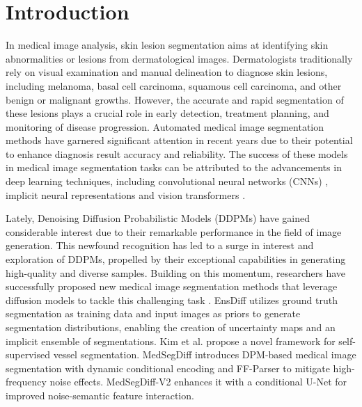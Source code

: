\documentclass[runningheads]{llncs}
\begin{document}
\section{Introduction}


In medical image analysis, skin lesion segmentation aims at identifying skin abnormalities or lesions from dermatological images. Dermatologists traditionally rely on visual examination and manual delineation to diagnose skin lesions, including melanoma, basal cell carcinoma, squamous cell carcinoma, and other benign or malignant growths. However, the accurate and rapid segmentation of these lesions plays a crucial role in early detection, treatment planning, and monitoring of disease progression. Automated medical image segmentation methods have garnered significant attention in recent years due to their potential to enhance diagnosis result accuracy and reliability. The success of these models in medical image segmentation tasks can be attributed to the advancements in deep learning techniques, including convolutional neural networks (CNNs) \cite{azad2022medical,ronneberger2015u,isensee2021nnu}, implicit neural representations \cite{molaei2023implicit} and vision transformers \cite{wang2021boundary,azad2023advances}.

Lately, Denoising Diffusion Probabilistic Models (DDPMs) \cite{ho2020denoising} have gained considerable interest due to their remarkable performance in the field of image generation. This newfound recognition has led to a surge in interest and exploration of DDPMs, propelled by their exceptional capabilities in generating high-quality and diverse samples. Building on this momentum, researchers have successfully proposed new medical image segmentation methods that leverage diffusion models to tackle this challenging task \cite{kazerouni2023diffusion}. EnsDiff \cite{wolleb2022diffusion} utilizes ground truth segmentation as training data and input images as priors to generate segmentation distributions, enabling the creation of uncertainty maps and an implicit ensemble of segmentations. Kim et al. \cite{kim2023diffusion} propose a novel framework for self-supervised vessel segmentation. MedSegDiff \cite{wu2022medsegdiff} introduces DPM-based medical image segmentation with dynamic conditional encoding and FF-Parser to mitigate high-frequency noise effects. MedSegDiff-V2 \cite{wu2023medsegdiff} enhances it with a conditional U-Net for improved noise-semantic feature interaction.
\end{document}
